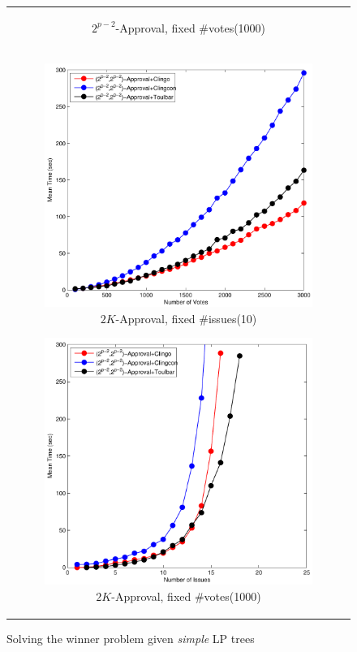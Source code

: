 \begin{figure}[ht!]
\begin{tabular}{c}
\begin{subfigure}[b]{0.44\textwidth}
    \caption{$2^{p-2}$-Approval, fixed \#votes(1000)}
		\label{fig:comparison:win:4}
	\end{subfigure}
  \\
  \begin{subfigure}[b]{0.44\textwidth}
		\includegraphics[width=\textwidth]{figs/2kAppFIMSCICP.pdf}
    \caption{$2K$-Approval, fixed \#issues(10)}
		\label{fig:comparison:win:5}
	\end{subfigure}
  \begin{subfigure}[b]{0.44\textwidth}
		\includegraphics[width=\textwidth]{figs/2kAppFVMSCICP.pdf}
    \caption{$2K$-Approval, fixed \#votes(1000)}
		\label{fig:comparison:win:6}
	\end{subfigure}
	\end{tabular}
  \caption{Solving the winner problem given \textit{simple} LP trees}
  \label{fig:win}

\end{figure}


